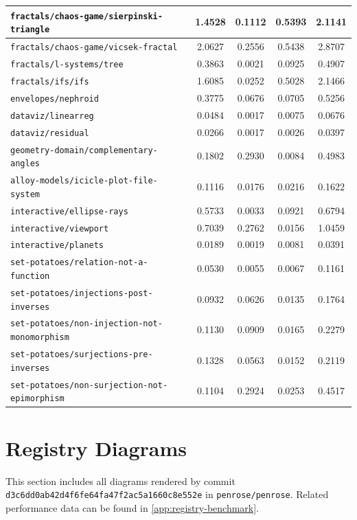 \begin{longtable}{|p{6.5cm}|c|c|c|c|}
    \texttt{fractals/chaos-game/sierpinski-triangle} & 1.4528 & 0.1112 & 0.5393 & 2.1141 \\ \hline
    \texttt{fractals/chaos-game/vicsek-fractal} & 2.0627 & 0.2556 & 0.5438 & 2.8707 \\ \hline
    \texttt{fractals/l-systems/tree} & 0.3863 & 0.0021 & 0.0925 & 0.4907 \\ \hline
    \texttt{fractals/ifs/ifs} & 1.6085 & 0.0252 & 0.5028 & 2.1466 \\ \hline
    \texttt{envelopes/nephroid} & 0.3775 & 0.0676 & 0.0705 & 0.5256 \\ \hline
    \texttt{dataviz/linearreg} & 0.0484 & 0.0017 & 0.0075 & 0.0676 \\ \hline
    \texttt{dataviz/residual} & 0.0266 & 0.0017 & 0.0026 & 0.0397 \\ \hline
    \texttt{geometry-domain/complementary-angles} & 0.1802 & 0.2930 & 0.0084 & 0.4983 \\ \hline
    \texttt{alloy-models/icicle-plot-file-system} & 0.1116 & 0.0176 & 0.0216 & 0.1622 \\ \hline
    \texttt{interactive/ellipse-rays} & 0.5733 & 0.0033 & 0.0921 & 0.6794 \\ \hline
    \texttt{interactive/viewport} & 0.7039 & 0.2762 & 0.0156 & 1.0459 \\ \hline
    \texttt{interactive/planets} & 0.0189 & 0.0019 & 0.0081 & 0.0391 \\ \hline
    \texttt{set-potatoes/relation-not-a-function} & 0.0530 & 0.0055 & 0.0067 & 0.1161 \\ \hline
    \texttt{set-potatoes/injections-post-inverses} & 0.0932 & 0.0626 & 0.0135 & 0.1764 \\ \hline
    \texttt{set-potatoes/non-injection-not-monomorphism} & 0.1130 & 0.0909 & 0.0165 & 0.2279 \\ \hline
    \texttt{set-potatoes/surjections-pre-inverses} & 0.1328 & 0.0563 & 0.0152 & 0.2119 \\ \hline
    \texttt{set-potatoes/non-surjection-not-epimorphism} & 0.1104 & 0.2924 & 0.0253 & 0.4517 \\ \hline
\end{longtable}


\chapter{\Penrose{} Registry Diagrams}
\label{app:registry-diagram}

This section includes all diagrams rendered by commit \texttt{d3c6dd0ab42d4f6fe64fa47f2ac5a1660c8e552e} in \texttt{penrose/penrose}. Related performance data can be found in \cref{app:registry-benchmark}.


